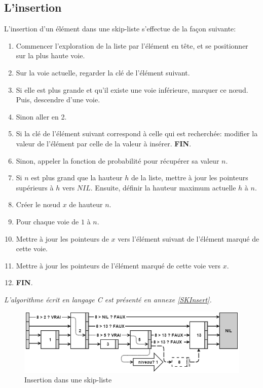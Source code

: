 \documentclass[hidelinks,a4paper, 12pt]{article}
\begin{document}
	\subsection{L'insertion}
	L'insertion d'un élément dans une skip-liste s'effectue de la façon suivante:
	\begin{enumerate}
		\item Commencer l'exploration de la liste par l'élément en tête, et se positionner sur la plus haute voie.
		\item Sur la voie actuelle, regarder la clé de l'élément suivant.
		\item Si elle est plus grande et qu'il existe une voie inférieure, marquer ce nœud. Puis, descendre d'une voie.
		\item Sinon aller en 2.
		\item Si la clé de l'élément suivant correspond à celle qui est recherchée: modifier la valeur de l'élément par celle de la valeur à insérer. \textbf{FIN}.
		\item Sinon, appeler la fonction de probabilité pour récupérer sa valeur $n$.
		\item Si $n$ est plus grand que la hauteur $h$ de la liste, mettre à jour les pointeurs supérieurs à $h$ vers $NIL$. Ensuite, définir la hauteur maximum actuelle $h$ à $n$.
		\item Créer le nœud $x$ de hauteur $n$.
		\item Pour chaque voie de $1$ à $n$.
		\item Mettre à jour les pointeurs de $x$ vers l'élément suivant de l'élément marqué de cette voie.
		\item Mettre à jour les pointeurs de l'élément marqué de cette voie vers $x$.
		\item \textbf{FIN}.
	\end{enumerate}
	\emph{L'algorithme écrit en langage C est présenté en annexe \ref{SKInsert}.}
	\begin{figure}[h]
		\includegraphics[width=\textwidth]{img/insert}
		\caption{Insertion dans une skip-liste}
		\label{SkipInsert}
	\end{figure}
	
\end{document}

